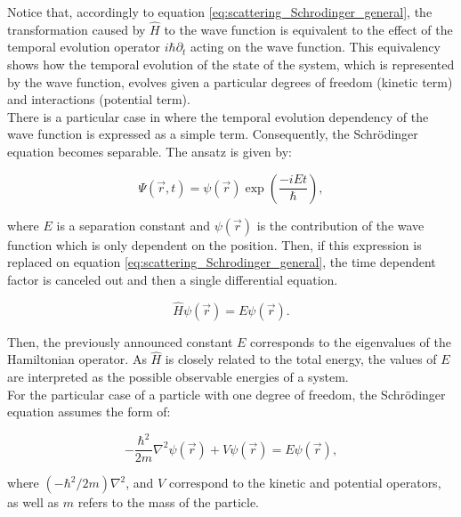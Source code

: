 \documentclass[openany]{book}
\begin{document}
Notice that, accordingly to equation \ref{eq:scattering_Schrodinger_general}, the transformation caused by $\hat H$ to the wave function is equivalent to the effect of the temporal evolution operator  $i \hbar \partial_t$ acting on the wave function. This equivalency shows how the temporal evolution of the state of the system, which is represented by the wave function, evolves given a particular degrees of freedom (kinetic term) and interactions (potential term). \\

There is a particular case in where the temporal evolution dependency of the wave function is expressed as a simple term. Consequently, the Schrödinger equation becomes separable. The ansatz is given by: 


\begin{equation}\label{eq:scattering_Schrodinger_separation}
	\Psi(\vec r, t) = \psi(\vec r)  \exp{\left(\frac{-iEt}{\hbar}\right)}, 
\end{equation}

where $E$ is a separation constant and $\psi(\vec r)$ is the contribution of the wave function which is only dependent on the position. Then, if this expression is replaced on equation \ref{eq:scattering_Schrodinger_general}, the time dependent factor is canceled out and then a single differential equation. 

\begin{equation}\label{eq:scattering_Schrodinger_timeIndependent}
	\hat H \psi (\vec r)  = E \psi (\vec r) .
\end{equation}

Then, the previously announced constant $E$ corresponds to the eigenvalues of the Hamiltonian operator. As $\hat H$ is closely related to the total energy, the values of $E$ are interpreted as the possible observable energies of a system.  \\

For the particular case of a particle with one degree of freedom, the Schrödinger equation assumes the form of:

\begin{equation}\label{eq:scattering_Schrodinger_timeIndependent_point}
	-\frac{\hbar^2}{2m} \nabla^2 \psi (\vec r) + V \psi (\vec r)  = E \psi (\vec r),
\end{equation}

where $(-\hbar^2/2m) \nabla^2$, and $V$ correspond to the kinetic and potential operators, as well as $m$ refers to the mass of the particle. \\
\end{document}
